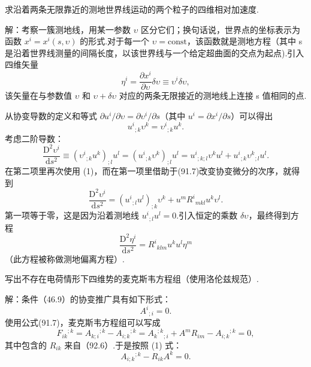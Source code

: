 \begin{xiti}

\quad 求沿着两条无限靠近的测地世界线运动的两个粒子的四维相对加速度.

解：考察一簇测地线，用某一参数 $\upsilon$ 区分它们；换句话说，世界点的坐标表示为函数 $x^i=x^i(s,\upsilon)$ 的形式.对于每一个 $\upsilon=\mathrm{const}$，该函数就是测地方程（其中 s 是沿着世界线测量的间隔长度，以该世界线与一个给定超曲面的交点为起点).引入四维矢量
\begin{equation*}
  \eta^i=\frac{\partial x^i}{\partial\upsilon}\delta\upsilon
  \equiv\upsilon^i\delta\upsilon,
\end{equation*}
该矢量在与参数值 $\upsilon$ 和 $\upsilon+\delta\upsilon$ 对应的两条无限接近的测地线上连接 s 值相同的点.

从协变导数的定义和等式 $\partial u^i/\partial\upsilon=\partial\upsilon^i/\partial s$（其中 $u^i=\partial x^i/\partial s$）可以得出
\begin{equation*}
  u^i{}_{;k}\upsilon^k=\upsilon^i{}_{;k}u^k.
\tag{1}\end{equation*}
考虑二阶导数：
\begin{equation*}
  \frac{\mathrm{D}^2\upsilon^i}{\mathrm{d}s^2}
  \equiv(\upsilon^i{}_{;k}u^k)_{;l}u^l
  =(u^i{}_{;k}\upsilon^k)_{;l}u^l
  =u^i{}_{;k;l}\upsilon^ku^l+u^i{}_{;k}\upsilon^k{}_{;l}u^l.
\end{equation*}
在第二项里再次使用 (1)，而在第一项里借助于(91.7)改变协变微分的次序，就得到
\begin{equation*}
  \frac{\mathrm{D}^2\upsilon^i}{\mathrm{d}s^2}
  =(u^i{}_{;l}u^l)_{;k}\upsilon^k
  +u^mR^i{}_{mkl}u^k\upsilon^l.
\end{equation*}
第一项等于零，这是因为沿着测地线 $u^i{}_{;l}u^l=0$.引入恒定的乘数 $\delta\upsilon$，最终得到方程
\begin{equation*}
  \frac{\mathrm{D}^2\eta^i}{\mathrm{d}s^2}
  =R^i{}_{klm}u^ku^l\eta^m
\tag{2}\end{equation*}
（此方程被称做测地偏离方程）.

\quad 写出不存在电荷情形下四维势的麦克斯韦方程组（使用洛伦兹规范）.

解：条件（46.9）的协变推广具有如下形式：
\begin{equation*}
  A^i{}_{;i}=0.
\tag{1}\end{equation*}
使用公式(91.7)，麦克斯韦方程组可以写成
\begin{equation*}
  F_{ik}{}^{;k}=A_{k;i}{}^{;k}-A_{i;k}{}^{;k}
  =A_k{}^{;k}{}_{;i}+A^mR_{im}-A_{i;k}{}^{;k}=0,
\end{equation*}
其中包含的 $R_{ik}$ 来自（92.6）.于是按照 (1) 式：
\begin{equation*}
  A_{i;k}{}^{;k}-R_{ik}A^k=0.
\tag{2}\end{equation*}

\end{xiti}

